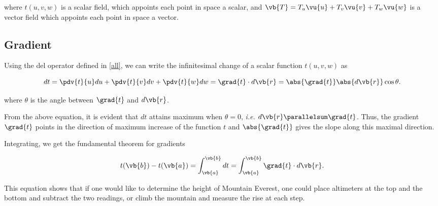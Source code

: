 \documentclass[english,a4paper,12pt]{report}
\begin{document}
where \(t (u,v,w)\) is a scalar field, which appoints each point in space a scalar, and \(\vb{T} = T_{u}\vu{u} + T_{v}\vu{v} + T_{w}\vu{w} \) is a vector field which appoints each point in space a vector.  

\subsection{Gradient}
Using the del operator defined in \cref{all}, we can write the infinitesimal change of a scalar function \(t(u,v,w)\) as

\begin{equation}
    dt = \pdv{t}{u}du + \pdv{t}{v}dv + \pdv{t}{w}dw = \grad{t} \cdot d\vb{r}  = \abs{\grad{t} }\abs{d \vb{r} }\cos \theta   . \label{dt} 
\end{equation}

where \(\theta\) is the angle between \(\grad{t}\) and \(d\vb{r}\).
	
From the above equation, it is evident that \(dt\) attains maximum when \(\theta = 0\), \textit{i.e.} \(d\vb{r} \parallelsum \grad{t}\). Thus, the gradient \(\grad{t}\) points in the direction of maximum increase of the function \(t\) and \(\abs{\grad{t}}\) gives the slope along this maximal direction.


	
Integrating, we get the fundamental theorem for gradients

\begin{equation} 
	t(\vb{b}) - t(\vb{a}) = \int_{\vb{a} }^{\vb{b} } dt = \int_{\vb{a}}^{\vb{b}} \grad{t} \cdot d\vb{r}. 
\end{equation}
	
This equation shows that if one would like to determine the height of Mountain Everest, one could place altimeters at the top and the bottom and subtract the two readings, or climb the mountain and measure the rise at each step.
\end{document}
